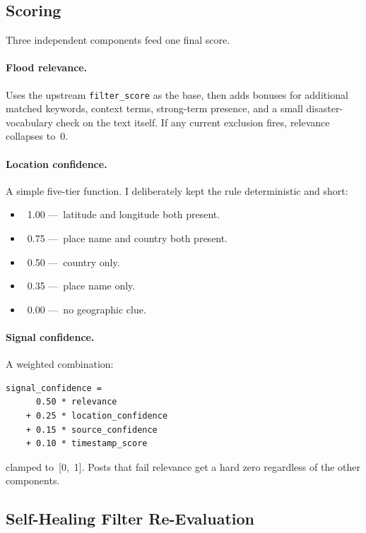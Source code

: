 \documentclass[11pt]{article}
\begin{document}
\subsection{Scoring}

Three independent components feed one final score.

\paragraph{Flood relevance.} Uses the upstream \texttt{filter\_score}
as the base, then adds bonuses for additional matched keywords, context
terms, strong-term presence, and a small disaster-vocabulary check on
the text itself. If any current exclusion fires, relevance collapses
to~0.

\paragraph{Location confidence.} A simple five-tier function. I
deliberately kept the rule deterministic and short:

\begin{itemize}[leftmargin=*]
  \item~1.00 ---~latitude and longitude both present.
  \item~0.75 ---~place name and country both present.
  \item~0.50 ---~country only.
  \item~0.35 ---~place name only.
  \item~0.00 ---~no geographic clue.
\end{itemize}

\paragraph{Signal confidence.} A weighted combination:

\begin{lstlisting}
signal_confidence =
      0.50 * relevance
    + 0.25 * location_confidence
    + 0.15 * source_confidence
    + 0.10 * timestamp_score
\end{lstlisting}

clamped to~[0,~1]. Posts that fail relevance get a hard zero
regardless of the other components.

\subsection{Self-Healing Filter Re-Evaluation}
\end{document}
